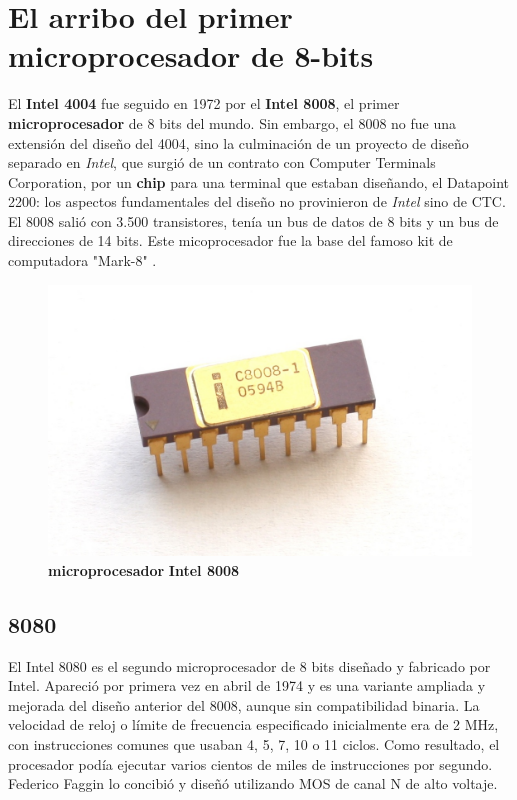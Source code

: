 \section{El arribo del primer microprocesador de 8-bits}
El \textbf{Intel 4004} fue seguido en 1972 por el \textbf{Intel 8008}, el primer \textbf{microprocesador} de 8 bits del mundo.
Sin embargo, el 8008 no fue una extensión del diseño del 4004, sino la culminación de un proyecto de diseño separado
en \emph{Intel}, que surgió de un contrato con Computer Terminals Corporation, por un \textbf{chip} para una terminal que
estaban diseñando, el Datapoint 2200: los aspectos fundamentales del diseño no provinieron de \emph{Intel} sino de CTC. 
El 8008 salió con 3.500 transistores, tenía un bus de datos de 8 bits y un bus de direcciones de 14 bits. Este micoprocesador
fue la base del famoso kit de computadora "Mark-8" .

\begin{figure}[htb]
	\centering
	\includegraphics[scale = 0.15]{Graphics/Intel_C8008-1.jpg}
	\caption{\textbf{microprocesador}  \textbf{Intel 8008}}
	\label{fig:13}
\end{figure}

\subsection{8080}
El Intel 8080 es el segundo microprocesador de 8 bits diseñado y fabricado por Intel. Apareció por primera vez en abril de 1974 y es una variante ampliada y mejorada
del diseño anterior del 8008, aunque sin compatibilidad binaria. La velocidad de reloj o límite de frecuencia especificado inicialmente era de 2 MHz, con instrucciones
comunes que usaban 4, 5, 7, 10 o 11 ciclos. Como resultado, el procesador podía ejecutar varios cientos de miles de instrucciones por segundo. Federico Faggin lo concibió 
y diseñó utilizando MOS de canal N de alto voltaje.

